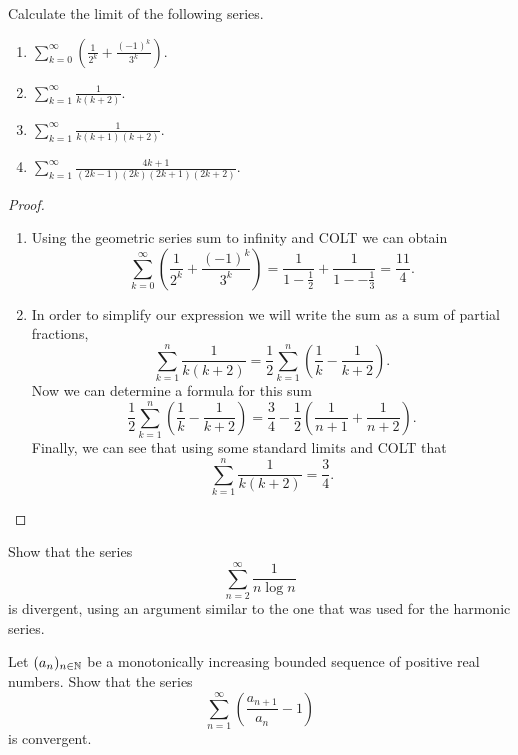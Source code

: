 \documentclass[10pt, a4paper]{article}
\renewcommand{\infsum}[1][n = 1]{\sum_{#1}^{\infty}}
\newcommand{\seq}[2][x]{(#1_{#2})_{#2 \in \N}}
\begin{document}
\begin{example}
    Calculate the limit of the following series.
    \begin{enumerate}[label = \alph*.]
        \item $\displaystyle \infsum[k = 0] \left(\frac{1}{2 ^ k} + \frac{(-1) ^ k}{3 ^ k}\right).$
        \item $\displaystyle \infsum[k = 1] \frac{1}{k(k + 2)}.$
        \item $\displaystyle \infsum[k = 1] \frac{1}{k(k + 1)(k + 2)}.$
        \item $\displaystyle \infsum[k = 1] \frac{4k + 1}{(2k - 1)(2k)(2k + 1)(2k + 2)}.$
    \end{enumerate}
    \begin{proof}
        \begin{enumerate}[label = \alph*.]
        \item 
        Using the geometric series sum to infinity and COLT we can obtain 
        \[
        \infsum[k = 0] \left(\frac{1}{2 ^ k} + \frac{(-1) ^ k}{3 ^ k}\right) = \frac{1}{1 - \frac{1}{2}} + \frac{1}{1 -- \frac{1}{3}} = \frac{11}{4}.
        \]
        \item
        In order to simplify our expression we will write the sum as a sum of partial fractions,
        \[
        \sum_{k = 1}^{n} \frac{1}{k(k + 2)} = \frac{1}{2}\sum_{k = 1}^{n} \left(\frac{1}{k} - \frac{1}{k + 2}\right).
        \]
        Now we can determine a formula for this sum
        \[
        \frac{1}{2}\sum_{k = 1}^{n} \left(\frac{1}{k} - \frac{1}{k + 2}\right) = \frac{3}{4} - \frac{1}{2}\left(\frac{1}{n + 1} + \frac{1}{n + 2}\right).
        \]
        Finally, we can see that using some standard limits and COLT that
        \[
        \sum_{k = 1}^{n} \frac{1}{k(k + 2)} = \frac{3}{4}.
        \]
    \end{enumerate}
    \end{proof}
\end{example}

\begin{example}
    Show that the series
    \[
    \sum_{n = 2}^{\infty}\frac{1}{n\log n}
    \]
    is divergent, using an argument similar to the one that was used for the harmonic series.
\end{example}

\begin{example}
    Let $\seq[a]{n}$ be a monotonically increasing bounded sequence of positive real numbers. Show that the series
    \[
    \sum_{n = 1}^{\infty}\left(\frac{a_{n + 1}}{a_n} - 1\right)
    \]
    is convergent.
\end{example}
\end{document}
